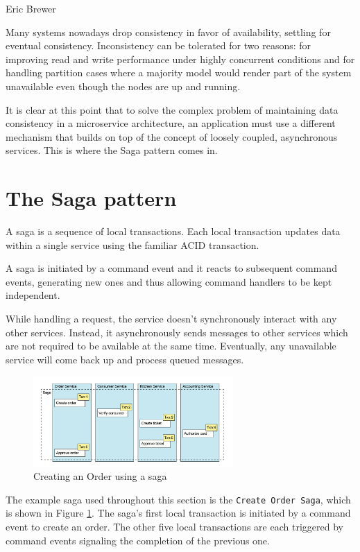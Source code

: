 \documentclass[conference]{IEEEtran}
\begin{document}
\hfill Eric Brewer

Many systems nowadays drop consistency in favor of availability, settling for eventual consistency. Inconsistency can be tolerated for two reasons: for improving read and write performance under highly concurrent conditions and for handling partition cases where a majority model would render part of the system unavailable even though the nodes are up and running. \cite{consistency-vs-availability}

It is clear at this point that to solve the complex problem of maintaining data consistency in a microservice architecture, an application must use a different mechanism that builds on top of the concept of loosely coupled, asynchronous services. This is where the Saga pattern comes in.

\section{The Saga pattern}

A saga is a sequence of local transactions. Each local transaction updates data within a single service using the familiar ACID transaction.

A saga is initiated by a command event and it reacts to subsequent command events, generating new ones and thus allowing command handlers to be kept independent.

While handling a request, the service doesn’t synchronously interact with any other services. Instead, it asynchronously sends messages to other services which are not required to be available at the same time. Eventually, any unavailable service will come back up and process queued messages.

\begin{figure}[!htbp]
\centering
\includegraphics[width=3in]{jpeg/order-saga}
\caption{Creating an Order using a saga}
\label{order_saga}
\end{figure}

The example saga used throughout this section is the \texttt{Create Order Saga}, which is shown in Figure \ref{order_saga}. The saga’s first local transaction is initiated by a command event to create an order. The other five local transactions are each triggered by command events signaling the completion of the previous one.
\end{document}
